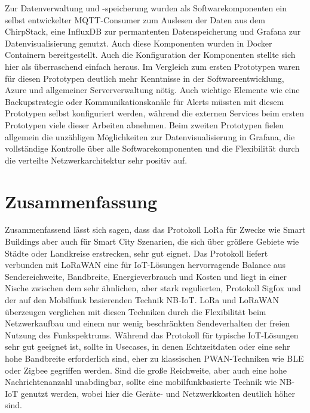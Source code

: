Zur Datenverwaltung und -speicherung wurden als Software\-komponenten ein selbst entwickelter MQTT-Consumer zum Auslesen der Daten aus dem ChirpStack, eine InfluxDB zur permantenten Datenspeicherung und Grafana zur Datenvisualisierung genutzt. Auch diese Komponenten wurden in Docker Containern bereitgestellt. Auch die Konfiguration der Komponenten stellte sich hier als überraschend einfach heraus. Im Vergleich zum ersten Prototypen waren für diesen Prototypen deutlich mehr Kenntnisse in der Softwareentwicklung, Azure und allgemeiner Serververwaltung nötig. Auch wichtige Elemente wie eine Backupstrategie oder Kommunikationskanäle für Alerts müssten mit diesem Prototypen selbst konfiguriert werden, während die externen Services beim ersten Prototypen viele dieser Arbeiten abnehmen. Beim zweiten Prototypen fielen allgemein die unzähligen Möglichkeiten zur Datenvisualisierung in Grafana, die vollständige Kontrolle über alle Softwarekomponenten und die Flexibilität durch die verteilte Netzwerkarchitektur sehr positiv auf.

\section{Zusammenfassung}

Zusammenfassend lässt sich sagen, dass das Protokoll LoRa für Zwecke wie Smart Buildings aber auch für Smart City Szenarien, die sich über größere Gebiete wie Städte oder Landkreise erstrecken, sehr gut eignet. Das Protokoll liefert verbunden mit LoRaWAN eine für IoT-Lösungen hervorragende Balance aus Sendereichweite, Bandbreite, Energieverbrauch und Kosten und liegt in einer Nische zwischen dem sehr ähnlichen, aber stark regulierten, Protokoll Sigfox und der auf den Mobilfunk basierenden Technik NB-IoT. LoRa und LoRaWAN überzeugen verglichen mit diesen Techniken durch die Flexibilität beim Netzwerkaufbau und einem nur wenig beschränkten Sendeverhalten der freien Nutzung des Funkspektrums. Während das Protokoll für typische IoT-Lösungen sehr gut geeignet ist, sollte in Usecases, in denen Echtzeitdaten oder eine sehr hohe Bandbreite erforderlich sind, eher zu klassischen PWAN-Techniken wie BLE oder Zigbee gegriffen werden. Sind die große Reichweite, aber auch eine hohe Nachrichtenanzahl unabdingbar, sollte eine mobilfunkbasierte Technik wie NB-IoT genutzt werden, wobei hier die Geräte- und Netzwerkkosten deutlich höher sind.

